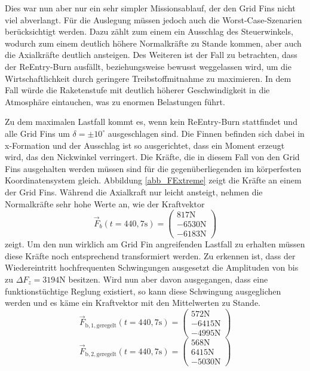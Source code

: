 Dies war nun aber nur ein sehr simpler Missionsablauf, der den Grid Fins nicht viel abverlangt. Für die Auslegung müssen jedoch auch die Worst-Case-Szenarien berücksichtigt werden. Dazu zählt zum einem ein Ausschlag des Steuerwinkels, wodurch zum einem deutlich höhere Normalkräfte zu Stande kommen, aber auch die Axialkräfte deutlich ansteigen. Des Weiteren ist der Fall zu betrachten, dass der ReEntry-Burn ausfällt, beziehungsweise bewusst weggelassen wird, um die Wirtschaftlichkeit durch geringere Treibstoffmitnahme zu maximieren. In dem Fall würde die Raketenstufe mit deutlich höherer Geschwindigkeit in die Atmosphäre eintauchen, was zu enormen Belastungen führt.

Zu dem maximalen Lastfall kommt es, wenn kein ReEntry-Burn stattfindet und alle Grid Fins um $\delta = \pm 10^\circ$ ausgeschlagen sind. Die Finnen befinden sich dabei in x-Formation und der Ausschlag ist so ausgerichtet, dass ein Moment erzeugt wird, das den Nickwinkel verringert. Die Kräfte, die in diesem Fall von den Grid Fins ausgehalten werden müssen sind für die gegenüberliegenden im körperfesten Koordinatensystem gleich. Abbildung \ref{abb_FExtreme} zeigt die Kräfte an einem der Grid Fins. Während die Axialkraft nur leicht ansteigt, nehmen die Normalkräfte sehr hohe Werte an, wie der Kraftvektor
\begin{equation}
	\vec{F}_b(t=440,7\mathrm{s})
	=\left(\begin{array}{c}817\mathrm{N}\\-6530\mathrm{N}\\-6183\mathrm{N}\end{array}\right)
\end{equation}
zeigt. Um den nun wirklich am Grid Fin angreifenden Lastfall zu erhalten müssen diese Kräfte noch entsprechend transformiert werden. Zu erkennen ist, dass der Wiedereintritt hochfrequenten Schwingungen ausgesetzt die Amplituden von bis zu $\Delta F_z = 3194$N besitzen. Wird nun aber davon ausgegangen, dass eine funktionstüchtige Reglung existiert, so kann diese Schwingung ausgeglichen werden und es käme ein Kraftvektor mit den Mittelwerten zu Stande.
\begin{equation}\label{eq_Fmax}
\vec{F}_\mathrm{b, 1, geregelt}(t=440,7\mathrm{s})
=\left(\begin{array}{c}572\mathrm{N}\\-6415\mathrm{N}\\-4995\mathrm{N}\end{array}\right)
\end{equation}
\begin{equation}\label{eq_Fmax2}
\vec{F}_\mathrm{b, 2, geregelt}(t=440,7\mathrm{s})
=\left(\begin{array}{c}568\mathrm{N}\\6415\mathrm{N}\\-5030\mathrm{N}\end{array}\right)
\end{equation}
